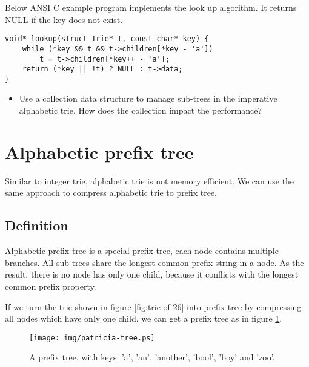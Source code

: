 \documentclass{article}
\begin{document}
Below ANSI C example program implements the look up algorithm.
It returns NULL if the key does not exist.

\lstset{language=C}
\begin{lstlisting}
void* lookup(struct Trie* t, const char* key) {
    while (*key && t && t->children[*key - 'a'])
        t = t->children[*key++ - 'a'];
    return (*key || !t) ? NULL : t->data;
}
\end{lstlisting}

\begin{Exercise}
\begin{itemize}
\item Use a collection data structure to manage sub-trees in the imperative
alphabetic trie. How does the collection impact the performance?
\end{itemize}
\end{Exercise}

\section{Alphabetic prefix tree}

Similar to integer trie, alphabetic trie is not memory
efficient. We can use the same approach to compress alphabetic trie to
prefix tree.

\subsection{Definition}

Alphabetic prefix tree is a special prefix tree, each node contains
multiple branches. All sub-trees share the longest common
prefix string in a node. As the result, there is no node has only one child,
because it conflicts with the longest common prefix property.

If we turn the trie shown in figure \ref{fig:trie-of-26} into prefix tree
by compressing all nodes which have only one child. we can get
a prefix tree as in figure \ref{fig:patricia-tree}.

\begin{figure}[htbp]
  \centering
  \texttt{[image: img/patricia-tree.ps]}
  \caption{A prefix tree, with keys: 'a', 'an', 'another', 'bool',
    'boy' and 'zoo'.}
  \label{fig:patricia-tree}
\end{figure}
\end{document}
